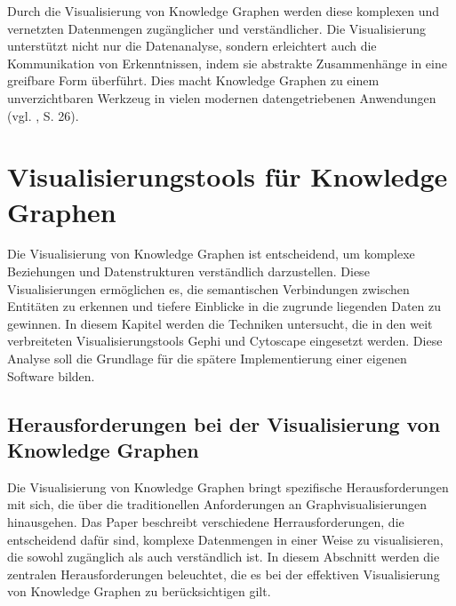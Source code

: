 Durch die Visualisierung von Knowledge Graphen werden diese komplexen und vernetzten Datenmengen zugänglicher und verständlicher. Die Visualisierung unterstützt nicht nur die Datenanalyse, sondern erleichtert auch die Kommunikation von Erkenntnissen, indem sie abstrakte Zusammenhänge in eine greifbare Form überführt. Dies macht Knowledge Graphen zu einem unverzichtbaren Werkzeug in vielen modernen datengetriebenen Anwendungen (vgl. \cite{knowledgeGraphIntroduction:Chaudhri}, S. 26).

\section{Visualisierungstools für Knowledge Graphen}

Die Visualisierung von Knowledge Graphen ist entscheidend, um komplexe Beziehungen und Datenstrukturen verständlich darzustellen. Diese Visualisierungen ermöglichen es, die semantischen Verbindungen zwischen Entitäten zu erkennen und tiefere Einblicke in die zugrunde liegenden Daten zu gewinnen. In diesem Kapitel werden die Techniken untersucht, die in den weit verbreiteten Visualisierungstools Gephi und Cytoscape eingesetzt werden. Diese Analyse soll die Grundlage für die spätere Implementierung einer eigenen Software bilden.

\subsection{Herausforderungen bei der Visualisierung von Knowledge Graphen}

Die Visualisierung von Knowledge Graphen bringt spezifische Herausforderungen mit sich, die über die traditionellen Anforderungen an Graphvisualisierungen hinausgehen. Das Paper  beschreibt verschiedene Herrausforderungen, die entscheidend dafür sind, komplexe Datenmengen in einer Weise zu visualisieren, die sowohl zugänglich als auch verständlich ist. In diesem Abschnitt werden die zentralen Herausforderungen beleuchtet, die es bei der effektiven Visualisierung von Knowledge Graphen zu berücksichtigen gilt.

